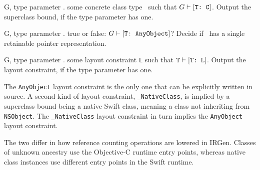 \documentclass[../generics]{subfiles}
\begin{document}
\begin{itemize}
{G, \tT}
{type parameter \tT.}
{some concrete class type \tC\ such that $G\vdash[\texttt{T:~C}]$.}
{Output the superclass bound, if the type parameter has one.}

{G, \tT}
{type parameter \tT.}
{true or false: $G\vdash[\texttt{T:~AnyObject}]$?}
{Decide if \tT\ has a single retainable pointer representation.}

{G, \tT}
{type parameter \tT.}
{some layout constraint \texttt{L} such that $\texttt{T}\vdash[\texttt{T:~L}]$.}
{Output the layout constraint, if the type parameter has one.}

The \texttt{AnyObject} layout constraint is the only one that can be explicitly written in source. A second kind of layout constraint, \verb|_NativeClass|, is implied by a superclass bound being a native Swift class, meaning a class not inheriting from \texttt{NSObject}. The \verb|_NativeClass| layout constraint in turn implies the \texttt{AnyObject} layout constraint.

The two differ in how reference counting operations are lowered in IRGen. Classes of unknown ancestry use the Objective-C runtime entry points, whereas native class instances use different entry points in the Swift runtime.
\end{itemize}
\end{document}
